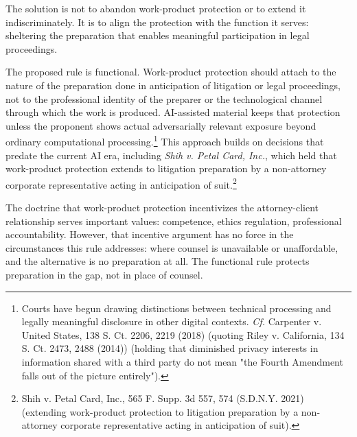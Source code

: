 \documentclass[
  12pt,
]{article}
\begin{document}
The solution is not to abandon work-product protection or to extend it
indiscriminately. It is to align the protection with the function it
serves: sheltering the preparation that enables meaningful participation
in legal proceedings.

The proposed rule is functional. Work-product protection should attach
to the nature of the preparation done in anticipation of litigation or
legal proceedings, not to the professional identity of the preparer or
the technological channel through which the work is produced.
AI-assisted material keeps that protection unless the proponent shows
actual adversarially relevant exposure beyond ordinary computational
processing.\footnote{Courts have begun drawing distinctions between
  technical processing and legally meaningful disclosure in other
  digital contexts. \emph{Cf.} Carpenter v. United States, 138 S. Ct.
  2206, 2219 (2018) (quoting Riley v. California, 134 S. Ct. 2473, 2488
  (2014)) (holding that diminished privacy interests in information
  shared with a third party do not mean "the Fourth Amendment falls out
  of the picture entirely").} This approach builds on decisions that
predate the current AI era, including \emph{Shih v. Petal Card, Inc.},
which held that work-product protection extends to litigation
preparation by a non-attorney corporate representative acting in
anticipation of suit.\footnote{Shih v. Petal Card, Inc., 565 F. Supp. 3d
  557, 574 (S.D.N.Y. 2021) (extending work-product protection to
  litigation preparation by a non-attorney corporate representative
  acting in anticipation of suit).}

The doctrine that work-product protection incentivizes the
attorney-client relationship serves important values: competence, ethics
regulation, professional accountability. However, that incentive
argument has no force in the circumstances this rule addresses: where
counsel is unavailable or unaffordable, and the alternative is no
preparation at all. The functional rule protects preparation in the gap,
not in place of counsel.
\end{document}
